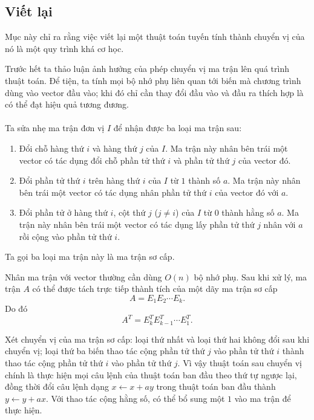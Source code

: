 \documentclass[11pt]{article}
\begin{document}
\subsection{Viết lại}

Mục này chỉ ra rằng việc viết lại một thuật toán tuyến tính thành chuyển vị của
nó là một quy trình khá cơ học.

Trước hết ta thảo luận ảnh hưởng của phép chuyển vị ma trận lên quá trình thuật
toán. Để tiện, ta tính mọi bộ nhớ phụ liên quan tới biến mà chương trình dùng
vào vector đầu vào; khi đó chỉ cần thay đổi đầu vào và đầu ra thích hợp là có
thể đạt hiệu quả tương đương.

\paragraph{}
Ta sửa nhẹ ma trận đơn vị \(I\) để nhận được ba loại ma trận sau:

\begin{enumerate}
  \item Đổi chỗ hàng thứ \(i\) và hàng thứ \(j\) của \(I\). Ma trận này nhân
  bên trái một vector có tác dụng đổi chỗ phần tử thứ \(i\) và phần tử thứ
  \(j\) của vector đó.
  \item Đổi phần tử thứ \(i\) trên hàng thứ \(i\) của \(I\) từ \(1\) thành số
  \(a\). Ma trận này nhân bên trái một vector có tác dụng nhân phần tử thứ
  \(i\) của vector đó với \(a\).
  \item Đổi phần tử ở hàng thứ \(i\), cột thứ \(j\) (\(j\ne i\)) của \(I\) từ
  \(0\) thành hằng số \(a\). Ma trận này nhân bên trái một vector có tác dụng
  lấy phần tử thứ \(j\) nhân với \(a\) rồi cộng vào phần tử thứ \(i\).
\end{enumerate}

Ta gọi ba loại ma trận này là ma trận sơ cấp.

Nhân ma trận với vector thường cần dùng \(O(n)\) bộ nhớ phụ. Sau khi xử lý, ma
trận \(A\) có thể được tách trực tiếp thành tích của một dãy ma trận sơ cấp
\[
  A=E_1E_2\cdots E_k.
\]
Do đó
\[
  A^T=E_k^TE_{k-1}^T\cdots E_1^T.
\]

Xét chuyển vị của ma trận sơ cấp: loại thứ nhất và loại thứ hai không đổi sau
khi chuyển vị; loại thứ ba biến thao tác cộng phần tử thứ \(j\) vào phần tử thứ
\(i\) thành thao tác cộng phần tử thứ \(i\) vào phần tử thứ \(j\). Vì vậy thuật
toán sau chuyển vị chính là thực hiện mọi câu lệnh của thuật toán ban đầu theo
thứ tự ngược lại, đồng thời đổi câu lệnh dạng \(x\leftarrow x+ay\) trong thuật
toán ban đầu thành \(y\leftarrow y+ax\). Với thao tác cộng hằng số, có thể bổ
sung một \(1\) vào ma trận để thực hiện.
\end{document}
